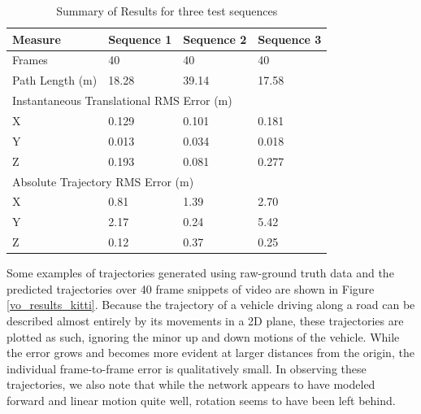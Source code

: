 \documentclass[openany]{book}
\begin{document}
\begin{table}[tbp]

    \caption{Summary of Results for three test sequences}
    \centering
    \begin{tabular}{@{}llll@{}}
        \toprule
        Measure            & Sequence 1    & Sequence 2   & Sequence 3  \\ \midrule
        Frames             & 40            & 40           & 40          \\
        Path Length (m)    & 18.28         & 39.14        & 17.58       \\ \midrule
        \multicolumn{4}{l}{Instantaneous Translational RMS Error (m)}   \\
        X                  & 0.129         & 0.101        & 0.181       \\
        Y                  & 0.013         & 0.034        & 0.018       \\
        Z                  & 0.193         & 0.081        & 0.277       \\ \midrule
        \multicolumn{4}{l}{Absolute Trajectory RMS Error (m)} \\
        X                  &  0.81         & 1.39         & 2.70        \\
        Y                  &  2.17         & 0.24         & 5.42        \\
        Z                  &  0.12         & 0.37         & 0.25        \\ \bottomrule
    
        \end{tabular}
        \label{kitti_vo_results_tabular}
    \end{table}



Some examples of trajectories generated using raw-ground truth data and the predicted trajectories over 40 frame snippets of video are shown in Figure \ref{vo_results_kitti}. Because the trajectory of a vehicle driving along a road can be described almost entirely by its movements in a 2D plane, these trajectories are plotted as such, ignoring the minor up and down motions of the vehicle. While the error grows and becomes more evident at larger distances from the origin, the individual frame-to-frame error is qualitatively small. In observing these trajectories, we also note that while the network appears to have modeled forward and linear motion quite well, rotation seems to have been left behind. 
\end{document}
